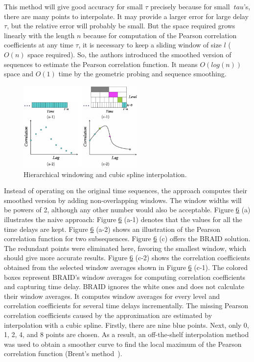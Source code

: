 This method will give good accuracy for small $\tau$ precisely because for small $\ tau$'s, there are many points to interpolate. It may provide a larger error for large delay $\tau$, but the relative error will probably be small. But the space required grows linearly with the length $n$ because for computation of the Pearson correlation coefficients at any time $\tau$, it is necessary to keep a sliding window of size $l$ ($O(n)$ space required). So, the authors introduced the smoothed version of sequences to estimate the Pearson correlation function. It means $O(log(n))$ space and $O(1)$ time by the geometric probing and sequence smoothing.
\begin{figure}[H]
\centering
    \includegraphics[width=0.55\textwidth]{figures/1.png}
    \caption{Hierarchical windowing and cubic spline interpolation.}
    \label{fig:BRAID_graphs}
\end{figure}
Instead of operating on the original time sequences, the approach computes their smoothed version by adding non-overlapping windows. The window widths will be powers of 2, although any other number would also be acceptable. Figure \hyperref[fig:BRAID_graphs]{6} (a) illustrates the naive approach: Figure \hyperref[fig:BRAID_graphs]{6} (a-1) denotes that the values for all the time delays are kept. Figure \hyperref[fig:BRAID_graphs]{6} (a-2) shows an illustration of the Pearson correlation function for two subsequences. Figure \hyperref[fig:BRAID_graphs]{6} (c) offers the BRAID solution. The redundant points were eliminated here, favoring the smallest window, which should give more accurate results. Figure \hyperref[fig:BRAID_graphs]{6} (c-2) shows the correlation coefficients obtained from the selected window averages shown in Figure \hyperref[fig:BRAID_graphs]{6} (c-1). The colored boxes represent BRAID's window averages for computing correlation coefficients and capturing time delay. BRAID ignores the white ones and does not calculate their window averages. It computes window averages for every level and correlation coefficients for several time delays incrementally. The missing Pearson correlation coefficients caused by the approximation are estimated by interpolation with a cubic spline. Firstly, there are nine blue points. Next, only 0, 1, 2, 4, and 8 points are chosen. As a result, an off-the-shelf interpolation method was used to obtain a smoother curve to find the local maximum of the Pearson correlation function (Brent's method~\cite{ref17}).
